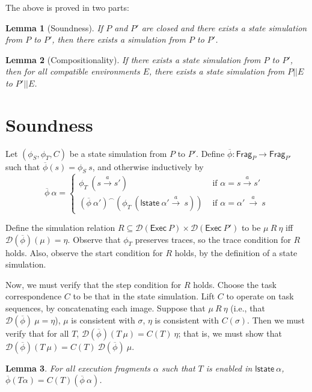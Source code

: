\documentclass{article}
\newcommand{\Exec}{\mathsf{Exec}}
\newcommand{\Frag}{\mathsf{Frag}}
\newcommand{\lst}{\mathsf{lstate}}
\newcommand{\D}{\mathcal{D}}
\newtheorem{lemma}{Lemma}
\begin{document}
The above is proved in two parts:
\begin{lemma}[Soundness]
    If $P$ and $P'$ are closed and there exists a state simulation from $P$ to $P'$, then there exists a simulation from $P$ to $P'$.
\end{lemma}

\begin{lemma}[Compositionality]
    If there exists a state simulation from $P$ to $P'$, then for all compatible environments $E$, there exists a state simulation from $P || E$ to $P' || E$.
\end{lemma}

\section{Soundness}
Let $(\phi_S, \phi_T, C)$ be a state simulation from $P$ to $P'$. Define $\overline{\phi} : \Frag_P \to \Frag_{P'}$ such that $\overline{\phi}(s) = \phi_S\ s$, and otherwise inductively by 
\[\overline{\phi}\ \alpha = \begin{cases}
        \phi_T\ (s \xrightarrow{a} s') & \text{ if $\alpha = s \xrightarrow{a} s'$ } \\
        (\overline{\phi}\ \alpha')^\frown (\phi_T\ (\lst\ \alpha' \xrightarrow{a}\ s)) & \text{ if $\alpha = \alpha'\ \xrightarrow{a}\ s$}
    \end{cases} \]

Define the simulation relation $R \subseteq \D(\Exec\ P) \times \D(\Exec\ P')$ to be $\mu\ R\ \eta$ iff $\D(\overline{\phi})(\mu) = \eta$. Observe that $\phi_T$ preserves traces, so the trace condition for $R$ holds. Also, observe the start condition for $R$ holds, by the definition of a state simulation.

Now, we must verify that the step condition for $R$ holds. Choose the task correspondence $C$ to be that in the state simulation. Lift $C$ to operate on task sequences, by concatenating each image. Suppose that $\mu\ R\ \eta$ (i.e., that $\D(\overline{\phi})\ \mu = \eta$), $\mu$ is consistent with $\sigma$, $\eta$ is consistent with $C(\sigma)$. Then we must verify that for all $T$, $\D(\overline{\phi})(T\ \mu) = C(T)\ \eta$; that is, we must show that $\D(\overline{\phi})(T\ \mu) = C(T)\ \D(\overline{\phi})\ \mu$.

\begin{lemma}
    For all execution fragments $\alpha$ such that $T$ is enabled in $\lst\ \alpha$, $\overline{\phi}(T \alpha) = C(T) (\overline{\phi}\ \alpha)$.
\end{lemma}
\end{document}
